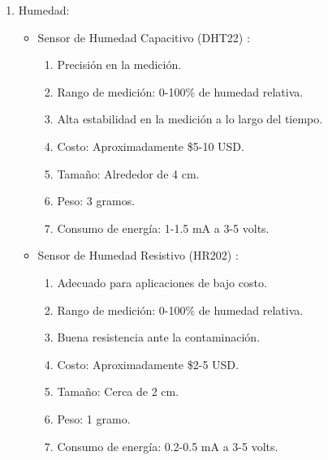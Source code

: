\begin{enumerate}
    \item Humedad:
    \begin{itemize}
        \item Sensor de Humedad Capacitivo (DHT22) \cite{84}:
        \begin{enumerate}
            \item Precisión en la medición.
\item Rango de medición: 0-100\% de humedad relativa.
\item Alta estabilidad en la medición a lo largo del tiempo.
\item Costo: Aproximadamente \$5-10 USD.
\item Tamaño: Alrededor de 4 cm.
\item Peso: 3 gramos.
\item Consumo de energía: 1-1.5 mA a 3-5 volts.

        \end{enumerate}
        \item Sensor de Humedad Resistivo (HR202) \cite{85}:
        \begin{enumerate}
            \item Adecuado para aplicaciones de bajo costo.
\item Rango de medición: 0-100\% de humedad relativa.
\item Buena resistencia ante la contaminación.
\item Costo: Aproximadamente \$2-5 USD.
\item Tamaño: Cerca de 2 cm.
\item Peso: 1 gramo.
\item Consumo de energía: 0.2-0.5 mA a 3-5 volts.
\end{enumerate}
\end{itemize}


\end{enumerate}
